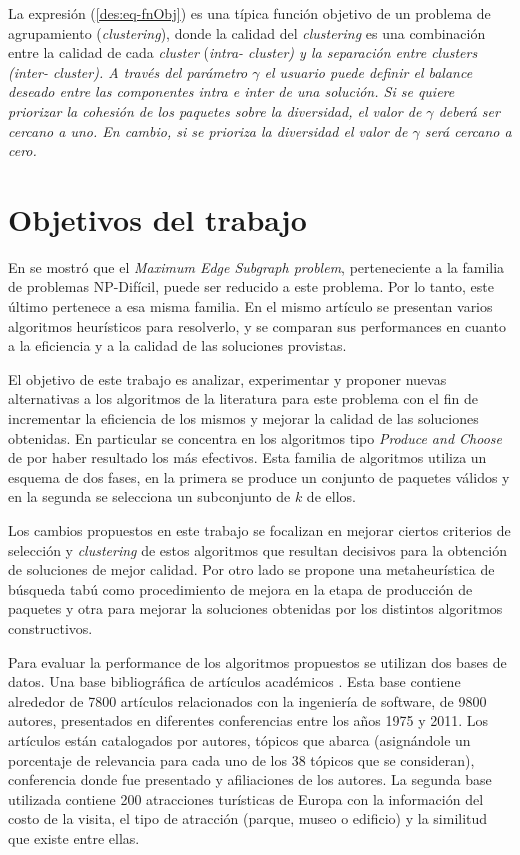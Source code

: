 La expresión (\ref{des:eq-fnObj}) es una típica función objetivo de un problema de agrupamiento ({\em clustering}), donde la calidad del {\em clustering} es una combinación entre la calidad de cada {\em cluster} (\em{intra}- cluster) y la separación entre {\em clusters} (\em{inter}- cluster). A través del parámetro $\gamma$ el usuario puede definir el balance deseado entre las componentes intra e inter de una solución. Si se quiere priorizar la cohesión de los paquetes sobre la diversidad, el  valor de $\gamma$ deberá ser cercano a uno. En cambio, si se prioriza la diversidad el valor de $\gamma$ será cercano a cero.

\section{Objetivos del trabajo}
En \cite{compositeRetrival} se mostró que el {\em Maximum Edge Subgraph problem}, perteneciente a la familia de problemas NP-Difícil, puede ser reducido a este problema. Por lo tanto, este último pertenece a esa misma familia. En el mismo artículo se presentan varios algoritmos heurísticos para resolverlo, y se comparan sus performances en cuanto a la eficiencia y a la calidad de las soluciones provistas.   

El objetivo de este trabajo es analizar, experimentar y proponer nuevas alternativas a los algoritmos de la literatura para este problema con el fin de incrementar la eficiencia de los mismos y mejorar la calidad de las soluciones obtenidas. En particular se concentra en los algoritmos tipo {\em Produce and Choose} de \cite{compositeRetrival} por haber resultado los más efectivos. Esta familia de algoritmos utiliza un esquema de dos fases, en la primera se produce un conjunto de paquetes válidos y en la segunda se selecciona un subconjunto de $k$ de ellos.

Los cambios propuestos en este trabajo se focalizan en mejorar ciertos criterios de selección y {\em clustering} de estos algoritmos que resultan decisivos para la obtención de soluciones de mejor calidad. Por otro lado se propone una metaheurística de búsqueda tabú como procedimiento de mejora en la etapa de producción de paquetes y otra para mejorar la soluciones obtenidas por los distintos algoritmos constructivos.
 
Para evaluar la performance de los algoritmos propuestos se utilizan dos bases de datos. Una base bibliográfica de artículos académicos \cite{dataDrive}. Esta base contiene alrededor de 7800 artículos relacionados con la ingeniería de software, de 9800 autores, presentados en diferentes conferencias entre los años 1975 y 2011. Los artículos están catalogados por autores, tópicos que abarca (asignándole un porcentaje de relevancia para cada uno de los 38 tópicos que se consideran), conferencia donde fue presentado y afiliaciones de los autores. La segunda base utilizada contiene 200 atracciones turísticas de Europa con la información del costo de la visita, el tipo de atracción (parque, museo o edificio) y la similitud que existe entre ellas.

